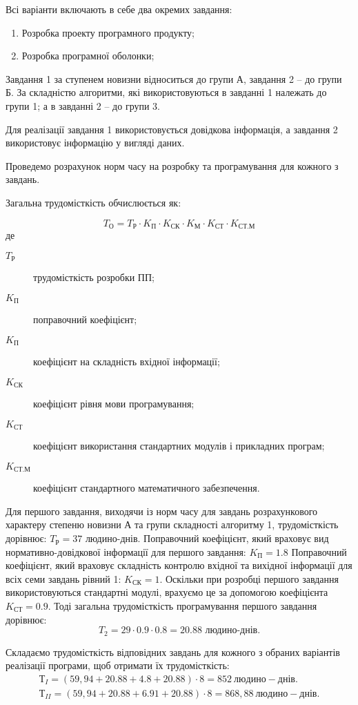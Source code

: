 \documentclass[../diploma]{subfiles}
\begin{document}
Всі варіанти включають в себе два окремих завдання:
\begin{enumerate}
\item Розробка проекту програмного продукту;
\item Розробка програмної оболонки;
\end{enumerate}

Завдання 1 за ступенем новизни відноситься до групи А, завдання 2 -- до групи Б. За складністю алгоритми, які використовуються в завданні 1 належать до групи 1; а в завданні 2 -- до групи 3.

Для реалізації завдання 1 використовується довідкова інформація, а завдання 2 використовує інформацію у вигляді даних.

Проведемо розрахунок норм часу на розробку та програмування для кожного з завдань.

Загальна трудомісткість обчислюється як: 

$$
T_О = T_Р\cdot K_П\cdot K_{СК}\cdot K_М\cdot K_{СТ}\cdot K_{СТ.М}
$$
де
\begin{description}
\item[$T_Р$] трудомісткість розробки ПП;
\item[$K_П$] поправочний коефіцієнт;
\item[$K_П$] коефіцієнт на складність вхідної інформації; 
\item[$K_{СК}$] коефіцієнт рівня мови програмування;
\item[$K_{СТ}$] коефіцієнт використання стандартних модулів і прикладних програм;
\item[$K_{СТ.М}$] коефіцієнт стандартного математичного забезпечення.
\end{description}

Для першого завдання, виходячи із норм часу для завдань розрахункового характеру степеню новизни А та групи складності алгоритму 1, трудомісткість дорівнює: $T_Р = 37$ людино-днів. Поправочний коефіцієнт, який враховує вид нормативно-довідкової інформації для першого завдання: $K_П = 1.8$ Поправочний коефіцієнт, який враховує складність контролю вхідної та вихідної інформації для всіх семи завдань рівний 1: $K_{СК} = 1$. Оскільки при розробці першого завдання використовуються стандартні модулі, врахуємо це за допомогою коефіцієнта $K_{СТ} = 0.9$. Тоді загальна трудомісткість програмування першого завдання дорівнює:
$$
T_2 = 29\cdot 0.9\cdot 0.8 = 20.88 \text{ людино-днів.}
$$

Складаємо трудомісткість відповідних завдань для кожного з обраних варіантів реалізації програми, щоб отримати їх трудомісткість:
\begin{gather*}
Т_I = (59,94  + 20.88 + 4.8 + 20.88)\cdot 8 = 852\ людино-днів. \\
Т_{II} = (59,94  + 20.88 + 6.91 + 20.88)\cdot 8 = 868,88\ людино-днів.
\end{gather*}
\end{document}

